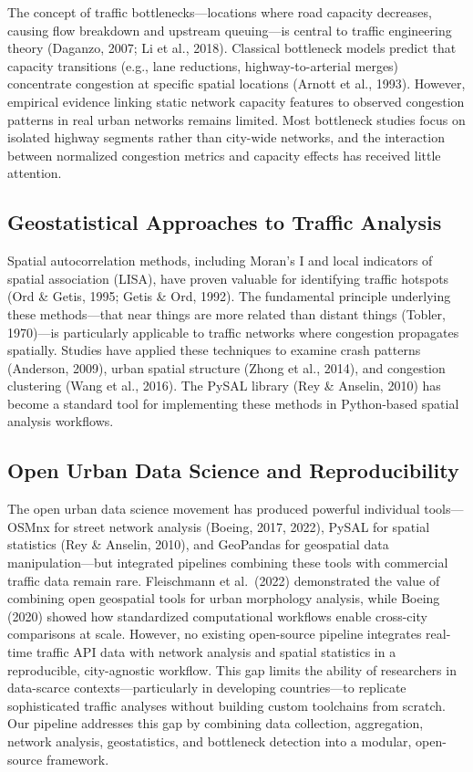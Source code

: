 \documentclass[12pt,a4paper]{article}
\begin{document}
The concept of traffic bottlenecks---locations where road capacity decreases, causing flow breakdown and upstream queuing---is central to traffic engineering theory (Daganzo, 2007; Li et al., 2018). Classical bottleneck models predict that capacity transitions (e.g., lane reductions, highway-to-arterial merges) concentrate congestion at specific spatial locations (Arnott et al., 1993). However, empirical evidence linking static network capacity features to observed congestion patterns in real urban networks remains limited. Most bottleneck studies focus on isolated highway segments rather than city-wide networks, and the interaction between normalized congestion metrics and capacity effects has received little attention.

\subsection{Geostatistical Approaches to Traffic Analysis}

Spatial autocorrelation methods, including Moran's I and local indicators of spatial association (LISA), have proven valuable for identifying traffic hotspots (Ord \& Getis, 1995; Getis \& Ord, 1992). The fundamental principle underlying these methods---that near things are more related than distant things (Tobler, 1970)---is particularly applicable to traffic networks where congestion propagates spatially. Studies have applied these techniques to examine crash patterns (Anderson, 2009), urban spatial structure (Zhong et al., 2014), and congestion clustering (Wang et al., 2016). The PySAL library (Rey \& Anselin, 2010) has become a standard tool for implementing these methods in Python-based spatial analysis workflows.

\subsection{Open Urban Data Science and Reproducibility}

The open urban data science movement has produced powerful individual tools---OSMnx for street network analysis (Boeing, 2017, 2022), PySAL for spatial statistics (Rey \& Anselin, 2010), and GeoPandas for geospatial data manipulation---but integrated pipelines combining these tools with commercial traffic data remain rare. Fleischmann et al.~(2022) demonstrated the value of combining open geospatial tools for urban morphology analysis, while Boeing (2020) showed how standardized computational workflows enable cross-city comparisons at scale. However, no existing open-source pipeline integrates real-time traffic API data with network analysis and spatial statistics in a reproducible, city-agnostic workflow. This gap limits the ability of researchers in data-scarce contexts---particularly in developing countries---to replicate sophisticated traffic analyses without building custom toolchains from scratch. Our pipeline addresses this gap by combining data collection, aggregation, network analysis, geostatistics, and bottleneck detection into a modular, open-source framework.
\end{document}
